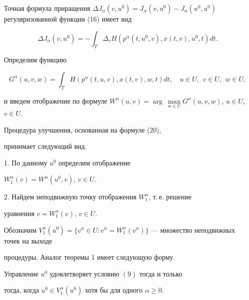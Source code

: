 Точная формула приращения $\Delta J_\alpha(v,u^0)=J_\alpha(v,u^0)- 


J_\alpha(u^0,u^0)$ регуляризованной функции (16) имеет вид 


\begin{equation} 


\Delta J_\alpha(v,u^0)=-\int_T \Delta_v H(p^\alpha 


(t,u^0,v),x(t,v),u^0,t)d t. 


\end{equation} 


 


Определим функцию


$$ 


G^\alpha(u,v,w)=\int_T H(p^\alpha(t,u,v),x(t,v),w,t)d t, 


\quad u\in U,\ \ v\in U,\ \ w\in U, 


$$ 


и введем отображение по формуле $W^\alpha(u,v)=\arg\ \max\limits_{w\in 


U}G^\alpha(u,v,w)$, $u\in U$, $v\in U$. 


 


Процедура улучшения, основанная на формуле (20), 


принимает следующий вид. 


 


1. По данному $u^0$ определим отображение 


$W^\alpha_1(v)=W^\alpha(u^0,v)$, $v\in U$. 


 


2. Найдем неподвижную точку отображения $W^\alpha_1$, т.\,е. решение 


уравнения $v=W^\alpha_1(v)$, $v\in U$. 


 


Обозначим $V^\alpha_1(u^0)=\{v^\alpha\in U:v^\alpha= 


W^\alpha_1(v^\alpha)\}$ --- множество неподвижных точек на выходе 


процедуры. Аналог теоремы 1 имеет следующую форму. 


 


\begin{thm} 


Управление $u^0$ удовлетворяет условию $(9)$ тогда и только 


тогда, когда $u^0\in V^\alpha_1(u^0)$ хотя бы для одного $\alpha\ge0$. 


\end{thm} 


